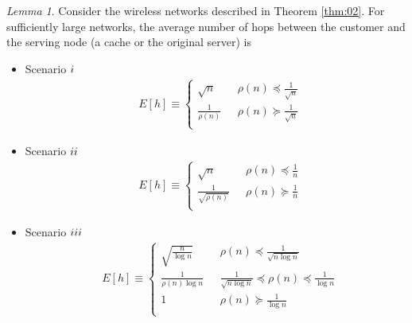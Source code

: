 \documentclass[journal]{IEEEtran}
\theoremstyle{plain}
\theoremstyle{remark}
\newtheorem{lemma}{Lemma}
\begin{document}
	\begin{lemma}\label{lem:02}
	Consider the wireless networks described in Theorem \ref{thm:02}. For sufficiently large networks, the average number of hops between the customer and the serving node (a cache or the original server) is 
	
	\begin{itemize}
		\item Scenario $\romannumeral 1$
			\begin{eqnarray}
		&E[h]\equiv\left\{\begin{array}{ll}
					\sqrt{n}& \ \ \ \rho(n) \preceq \frac{1}{\sqrt{n}} \\
					\frac{1}{\rho(n)}& \ \ \ \rho(n) \succeq \frac{1}{\sqrt{n}}  \label{eq:hi} \\
		\end{array}\right .
	\end{eqnarray}

		\item Scenario $\romannumeral 2$
		\begin{eqnarray}
		&E[h]\equiv\left\{\begin{array}{ll}
					\sqrt{n}& \ \ \ \rho(n) \preceq \frac{1}{n} \\
					\frac{1}{\sqrt{\rho(n)}}& \ \ \ \rho(n) \succeq \frac{1}{n} \label{eq:hii} \\
		\end{array}\right .
	\end{eqnarray}
	
		\item Scenario $\romannumeral 3$
		\begin{eqnarray}
		&E[h]\equiv\left\{\begin{array}{ll}
					\sqrt{\frac{n}{\log n}}& \ \ \ \rho(n) \preceq \frac{1}{\sqrt{n\log n}} \\
					\frac{1}{\rho(n) \log n}& \ \ \ \frac{1}{\sqrt{n\log n}} \preceq \rho(n) \preceq \frac{1}{\log n} \\
					1& \ \ \ \rho(n) \succeq \frac{1}{\log n} \label{eq:hiii} \\
		\end{array}\right .
	\end{eqnarray}
	
		\end{itemize}
\end{lemma}
\end{document}
